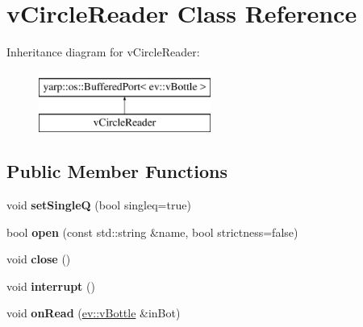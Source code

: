 \hypertarget{classvCircleReader}{}\section{v\+Circle\+Reader Class Reference}
\label{classvCircleReader}
Inheritance diagram for v\+Circle\+Reader\+:\begin{figure}[H]
\begin{center}
\leavevmode
\includegraphics[height=2.000000cm]{classvCircleReader}
\end{center}
\end{figure}
\subsection*{Public Member Functions}
\begin{DoxyCompactItemize}
\item 
void {\bfseries set\+SingleQ} (bool singleq=true)\hypertarget{classvCircleReader_a35b57eb759bf78b3199e2b058f509b19}{}\label{classvCircleReader_a35b57eb759bf78b3199e2b058f509b19}

\item 
bool {\bfseries open} (const std\+::string \&name, bool strictness=false)\hypertarget{classvCircleReader_aeea09b1b0a4f6ca43362430e2b7c13f3}{}\label{classvCircleReader_aeea09b1b0a4f6ca43362430e2b7c13f3}

\item 
void {\bfseries close} ()\hypertarget{classvCircleReader_a963ecb3d9e66c9a6d0dd3deb0107d333}{}\label{classvCircleReader_a963ecb3d9e66c9a6d0dd3deb0107d333}

\item 
void {\bfseries interrupt} ()\hypertarget{classvCircleReader_adb1e49808d1ff24b38e68ad3c706d87a}{}\label{classvCircleReader_adb1e49808d1ff24b38e68ad3c706d87a}

\item 
void {\bfseries on\+Read} (\hyperlink{classev_1_1vBottle}{ev\+::v\+Bottle} \&in\+Bot)\hypertarget{classvCircleReader_ae0f761bdd9af2bae8edc2e0f2766ff39}{}\label{classvCircleReader_ae0f761bdd9af2bae8edc2e0f2766ff39}

\end{DoxyCompactItemize}
